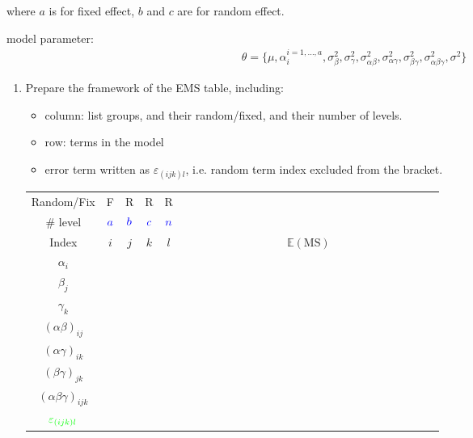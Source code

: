     where $ a $ is for fixed effect, $ b  $ and $ c  $ are for random effect.
    
    model parameter:
    \begin{align}
        \theta =\{\mu ,\alpha _i^{i=1,\ldots,a}, \sigma _{\beta }^2,\sigma ^2_\gamma ,\sigma ^2_{\alpha \beta },\sigma ^2_{\alpha \gamma },\sigma ^2_{\beta \gamma },\sigma ^2_{\alpha \beta \gamma },\sigma ^2\} 
    \end{align}
    

\begin{enumerate}[topsep=2pt,itemsep=2pt]
    \item Prepare the framework of the EMS table, including:
    \begin{itemize}[topsep=2pt,itemsep=0pt]
        \item column: list groups, and their {\color{red}random/fixed}, and their {\color{blue}number of levels}.
        \item row: terms in the model
        \item {\color{green}error term} written as $ \varepsilon _{(ijk)l} $, i.e. random term index excluded from the bracket.
    \end{itemize}
    
    \begin{table}[H]
        \centering
        \renewcommand\arraystretch{1}
        \begin{tabular}{cccccc}
            \hline
            \hline
            Random/Fix                      &{\color{red}F}      &{\color{red}R}      &{\color{red}R}      &{\color{red}R}      &$ \qquad\qquad\qquad\qquad\qquad\qquad\qquad\qquad\qquad\qquad\qquad$\\
            \# level                        &$ \color{blue}a $  &$ \color{blue}b $  &$ \color{blue}c $  &$ \color{blue}n $  &\\
            Index                           &$ i $  &$ j $  &$ k $  &$ l $  &$ \mathbb{E}\left( \mathrm{MS}  \right)  $\\
            \hline
            $ \alpha _i $                   &       &       &       &       &\\
            $ \beta _j $                    &       &       &       &       &\\
            $ \gamma _k $                   &       &       &       &       &\\
            $ (\alpha \beta )_{ij} $        &       &       &       &       &\\
            $ (\alpha \gamma )_{ik} $       &       &       &       &       &\\
            $ (\beta \gamma )_{jk} $        &       &       &       &       &\\
            $ (\alpha \beta \gamma )_{ijk} $&       &       &       &       &\\
            $ \color{green}\varepsilon _{(ijk)l} $       &       &       &       &       &\\
            \hline
            \hline
        \end{tabular}
        \label{}
    \end{table}


\end{enumerate}
